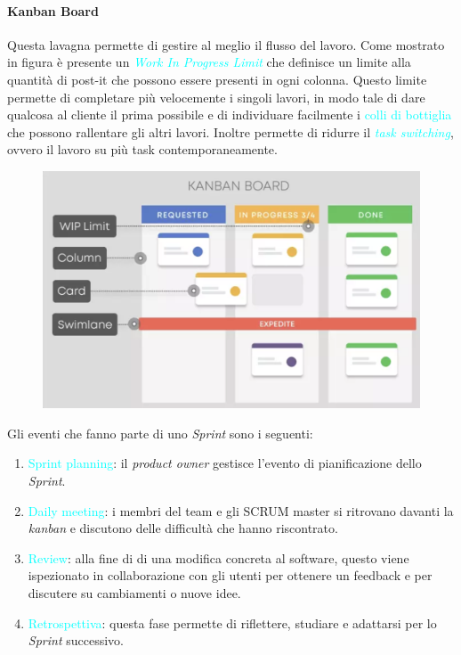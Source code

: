 \paragraph{Kanban Board} Questa lavagna permette di gestire al meglio il flusso del lavoro. Come mostrato in figura è presente
un \emph{\textcolor{cyan}{Work In Progress Limit}} che definisce un limite alla quantità di post-it che possono essere presenti in
ogni colonna. Questo limite permette di completare più velocemente i singoli lavori, in modo tale di dare qualcosa al cliente il prima possibile e di
individuare facilmente i \textcolor{cyan}{colli di bottiglia} che possono rallentare gli altri lavori.
Inoltre permette di ridurre il \emph{\textcolor{cyan}{task switching}}, ovvero il lavoro su più task contemporaneamente.

\begin{figure}[h]
    \begin{center}
        \includegraphics[scale=0.5]{img/kanboard.png}
    \end{center}
\end{figure}

Gli eventi che fanno parte di uno \emph{Sprint} sono i seguenti:
\begin{enumerate}
    \item \textcolor{cyan}{Sprint planning}: il \emph{product owner} gestisce l'evento di pianificazione dello \emph{Sprint}.
    \item \textcolor{cyan}{Daily meeting}: i membri del team e gli SCRUM master si ritrovano davanti la \emph{kanban} e discutono delle
        difficultà che hanno riscontrato.
    \item \textcolor{cyan}{Review}: alla fine di di una modifica concreta al software, questo viene ispezionato in collaborazione con gli utenti per ottenere un feedback
        e per discutere su cambiamenti o nuove idee.
    \item \textcolor{cyan}{Retrospettiva}: questa fase permette di riflettere, studiare e adattarsi per lo \emph{Sprint} successivo.
\end{enumerate}